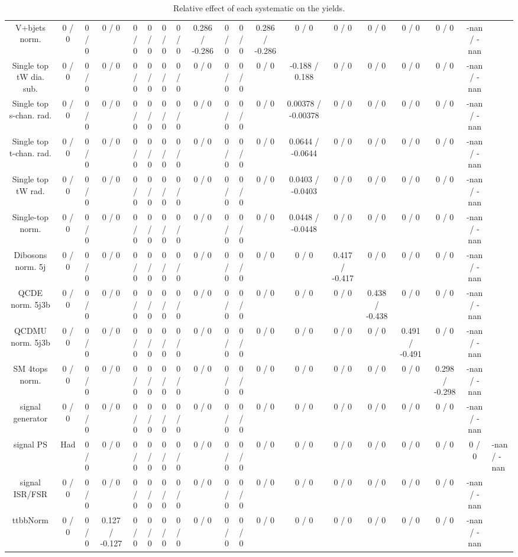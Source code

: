 \documentclass[10pt]{article}
\begin{document}
\begin{table}[htbp]
\begin{center}
\begin{tabular}{|c|c|c|c|c|c|c|c|c|c|c|c|c|c|c|c|c|c|}
  V+bjets norm. & 0 / 0 & 0 / 0 & 0 / 0 & 0 / 0 & 0 / 0 & 0 / 0 & 0 / 0 & 0.286 / -0.286 & 0 / 0 & 0 / 0 & 0.286 / -0.286 & 0 / 0 & 0 / 0 & 0 / 0 & 0 / 0 & 0 / 0 & -nan / -nan \\ 
  Single top tW dia. sub. & 0 / 0 & 0 / 0 & 0 / 0 & 0 / 0 & 0 / 0 & 0 / 0 & 0 / 0 & 0 / 0 & 0 / 0 & 0 / 0 & 0 / 0 & -0.188 / 0.188 & 0 / 0 & 0 / 0 & 0 / 0 & 0 / 0 & -nan / -nan \\ 
  Single top s-chan. rad. & 0 / 0 & 0 / 0 & 0 / 0 & 0 / 0 & 0 / 0 & 0 / 0 & 0 / 0 & 0 / 0 & 0 / 0 & 0 / 0 & 0 / 0 & 0.00378 / -0.00378 & 0 / 0 & 0 / 0 & 0 / 0 & 0 / 0 & -nan / -nan \\ 
  Single top t-chan. rad. & 0 / 0 & 0 / 0 & 0 / 0 & 0 / 0 & 0 / 0 & 0 / 0 & 0 / 0 & 0 / 0 & 0 / 0 & 0 / 0 & 0 / 0 & 0.0644 / -0.0644 & 0 / 0 & 0 / 0 & 0 / 0 & 0 / 0 & -nan / -nan \\ 
  Single top tW rad. & 0 / 0 & 0 / 0 & 0 / 0 & 0 / 0 & 0 / 0 & 0 / 0 & 0 / 0 & 0 / 0 & 0 / 0 & 0 / 0 & 0 / 0 & 0.0403 / -0.0403 & 0 / 0 & 0 / 0 & 0 / 0 & 0 / 0 & -nan / -nan \\ 
  Single-top norm. & 0 / 0 & 0 / 0 & 0 / 0 & 0 / 0 & 0 / 0 & 0 / 0 & 0 / 0 & 0 / 0 & 0 / 0 & 0 / 0 & 0 / 0 & 0.0448 / -0.0448 & 0 / 0 & 0 / 0 & 0 / 0 & 0 / 0 & -nan / -nan \\ 
  Dibosons norm. 5j & 0 / 0 & 0 / 0 & 0 / 0 & 0 / 0 & 0 / 0 & 0 / 0 & 0 / 0 & 0 / 0 & 0 / 0 & 0 / 0 & 0 / 0 & 0 / 0 & 0.417 / -0.417 & 0 / 0 & 0 / 0 & 0 / 0 & -nan / -nan \\ 
  QCDE norm. 5j3b & 0 / 0 & 0 / 0 & 0 / 0 & 0 / 0 & 0 / 0 & 0 / 0 & 0 / 0 & 0 / 0 & 0 / 0 & 0 / 0 & 0 / 0 & 0 / 0 & 0 / 0 & 0.438 / -0.438 & 0 / 0 & 0 / 0 & -nan / -nan \\ 
  QCDMU norm. 5j3b & 0 / 0 & 0 / 0 & 0 / 0 & 0 / 0 & 0 / 0 & 0 / 0 & 0 / 0 & 0 / 0 & 0 / 0 & 0 / 0 & 0 / 0 & 0 / 0 & 0 / 0 & 0 / 0 & 0.491 / -0.491 & 0 / 0 & -nan / -nan \\ 
  SM 4tops norm. & 0 / 0 & 0 / 0 & 0 / 0 & 0 / 0 & 0 / 0 & 0 / 0 & 0 / 0 & 0 / 0 & 0 / 0 & 0 / 0 & 0 / 0 & 0 / 0 & 0 / 0 & 0 / 0 & 0 / 0 & 0.298 / -0.298 & -nan / -nan \\ 
  signal generator & 0 / 0 & 0 / 0 & 0 / 0 & 0 / 0 & 0 / 0 & 0 / 0 & 0 / 0 & 0 / 0 & 0 / 0 & 0 / 0 & 0 / 0 & 0 / 0 & 0 / 0 & 0 / 0 & 0 / 0 & 0 / 0 & -nan / -nan \\ 
  signal PS & Had & 0 / 0 & 0 / 0 & 0 / 0 & 0 / 0 & 0 / 0 & 0 / 0 & 0 / 0 & 0 / 0 & 0 / 0 & 0 / 0 & 0 / 0 & 0 / 0 & 0 / 0 & 0 / 0 & 0 / 0 & 0 / 0 & -nan / -nan \\ 
  signal ISR/FSR & 0 / 0 & 0 / 0 & 0 / 0 & 0 / 0 & 0 / 0 & 0 / 0 & 0 / 0 & 0 / 0 & 0 / 0 & 0 / 0 & 0 / 0 & 0 / 0 & 0 / 0 & 0 / 0 & 0 / 0 & 0 / 0 & -nan / -nan \\ 
 ttbbNorm & 0 / 0 & 0 / 0 & 0.127 / -0.127 & 0 / 0 & 0 / 0 & 0 / 0 & 0 / 0 & 0 / 0 & 0 / 0 & 0 / 0 & 0 / 0 & 0 / 0 & 0 / 0 & 0 / 0 & 0 / 0 & 0 / 0 & -nan / -nan \\ 
\hline 
\end{tabular} 
\caption{Relative effect of each systematic on the yields.} 
\end{center} 
\end{table} 
\end{document}

